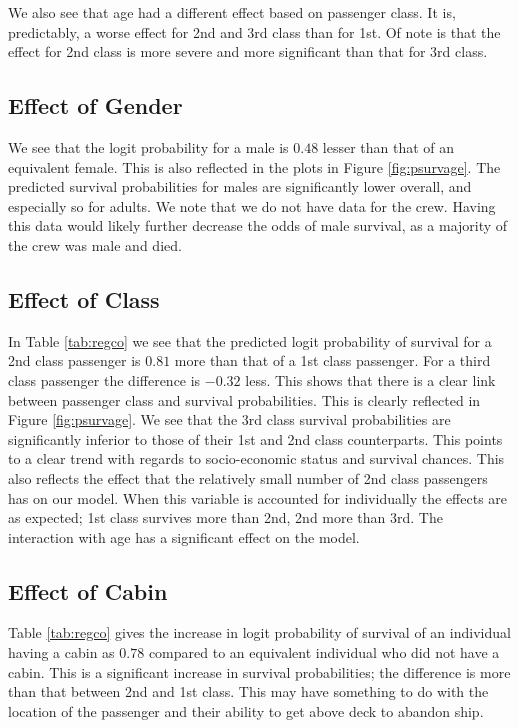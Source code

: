 \documentclass[9pt]{extarticle}
\begin{document}
We also see that age had a different effect based on passenger class. It is, predictably, a worse effect for 2nd and 3rd class than for 1st. Of note is that the effect for 2nd class is more severe and more significant than that for 3rd class.

\subsection{Effect of Gender}

We see that the logit probability for a male is $0.48$ lesser than that of an equivalent female. This is also reflected in the plots in Figure \ref{fig:psurvage}. The predicted survival probabilities for males are significantly lower overall, and especially so for adults. We note that we do not have data for the crew. Having this data would likely further decrease the odds of male survival, as a majority of the crew was male and died.

\subsection{Effect of Class}

In Table \ref{tab:regco} we see that the predicted logit probability of survival for a 2nd class passenger is $0.81$ more than that of a 1st class passenger. For a third class passenger the difference is $-0.32$ less. This shows that there is a clear link between passenger class and survival probabilities. This is clearly reflected in Figure \ref{fig:psurvage}. We see that the 3rd class survival probabilities are significantly inferior to those of their 1st and 2nd class counterparts. This points to a clear trend with regards to socio-economic status and survival chances. This also reflects the effect that the relatively small number of 2nd class passengers has on our model. When this variable is accounted for individually the effects are as expected; 1st class survives more than 2nd, 2nd more than 3rd. The interaction with age has a significant effect on the model.

\subsection{Effect of Cabin}

Table \ref{tab:regco} gives the increase in logit probability of survival of an individual having a cabin as $0.78$ compared to an equivalent individual who did not have a cabin. 
This is a significant increase in survival probabilities; the difference is more than that between 2nd and 1st class. This may have something to do with the location of the passenger and their ability to get above deck to abandon ship. 
\end{document}
